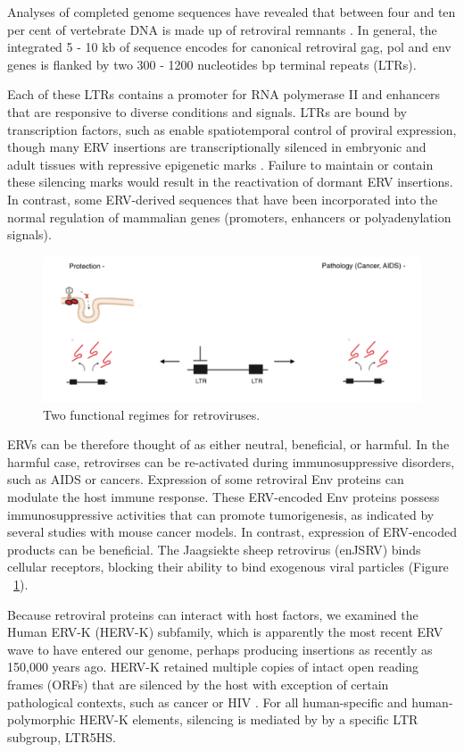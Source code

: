 Analyses of completed genome sequences have revealed that between four and ten per cent of vertebrate DNA is made up of retroviral remnants \cite{Stoye:2012gqa}. In general, the integrated 5 - 10 kb of sequence encodes for canonical retroviral gag, pol and env genes is flanked by two 300 - 1200 nucleotides bp terminal repeats (LTRs).

Each of these LTRs contains a promoter for RNA polymerase II and enhancers that are responsive to diverse conditions and signals. LTRs are bound by transcription factors, such as enable spatiotemporal control of proviral expression, though many ERV insertions are transcriptionally silenced in embryonic and adult tissues with repressive epigenetic marks \cite{Stoye:2012gqa}. Failure to maintain or contain these silencing marks would result in the reactivation of dormant ERV insertions. In contrast, some ERV-derived sequences that have been incorporated into the normal regulation of mammalian genes (promoters, enhancers or polyadenylation signals). 

\begin{figure}
\center\includegraphics[width=130mm,scale=0.5]{Figures/Fig24}
\caption{Two functional regimes for retroviruses.}
\label{fig:Fig24}
\end{figure}

ERVs can be therefore thought of as either neutral, beneficial, or harmful. In the harmful case, retrovirses can be re-activated during immunosuppressive disorders, such as AIDS or cancers. Expression of some retroviral Env proteins can modulate the host immune response. These ERV-encoded Env proteins possess immunosuppressive activities that can promote tumorigenesis, as indicated by several studies with mouse cancer models. In contrast, expression of ERV-encoded products can be beneficial. The Jaagsiekte sheep retrovirus (enJSRV) binds cellular receptors, blocking their ability to bind exogenous viral particles \cite{Spencer:2003hv} (Figure ~\ref{fig:Fig24}).

Because retroviral proteins can interact with host factors, we examined the Human ERV-K (HERV-K) subfamily, which is apparently the most recent ERV wave to have entered our genome, perhaps producing insertions as recently as 150,000 years ago. HERV-K retained multiple copies of intact open reading frames (ORFs) that are silenced by the host with exception of certain pathological contexts, such as cancer or HIV \cite{WangJohanning:2003es}. For all human-specific and human-polymorphic HERV-K elements, silencing is mediated by by a specific LTR subgroup, LTR5HS. 

